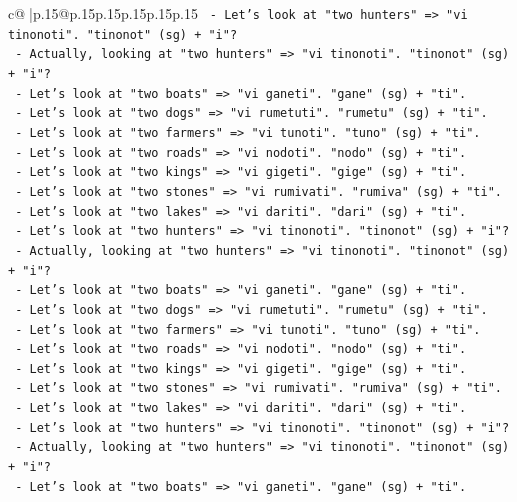 \documentclass{article}
\begin{document}
{\begin{supertabular}{c@{$\;$}|p{.15\linewidth}@{}p{.15\linewidth}p{.15\linewidth}p{.15\linewidth}p{.15\linewidth}p{.15\linewidth}}
{{{\texttt{    {-} Let's look at "two hunters" => "vi tinonoti". "tinonot" (sg) + "i"?} \\
\texttt{    {-} Actually, looking at "two hunters" => "vi tinonoti". "tinonot" (sg) + "i"?} \\
\texttt{    {-} Let's look at "two boats" => "vi ganeti". "gane" (sg) + "ti".} \\
\texttt{    {-} Let's look at "two dogs" => "vi rumetuti". "rumetu" (sg) + "ti".} \\
\texttt{    {-} Let's look at "two farmers" => "vi tunoti". "tuno" (sg) + "ti".} \\
\texttt{    {-} Let's look at "two roads" => "vi nodoti". "nodo" (sg) + "ti".} \\
\texttt{    {-} Let's look at "two kings" => "vi gigeti". "gige" (sg) + "ti".} \\
\texttt{    {-} Let's look at "two stones" => "vi rumivati". "rumiva" (sg) + "ti".} \\
\texttt{    {-} Let's look at "two lakes" => "vi dariti". "dari" (sg) + "ti".} \\
\texttt{    {-} Let's look at "two hunters" => "vi tinonoti". "tinonot" (sg) + "i"?} \\
\texttt{    {-} Actually, looking at "two hunters" => "vi tinonoti". "tinonot" (sg) + "i"?} \\
\texttt{    {-} Let's look at "two boats" => "vi ganeti". "gane" (sg) + "ti".} \\
\texttt{    {-} Let's look at "two dogs" => "vi rumetuti". "rumetu" (sg) + "ti".} \\
\texttt{    {-} Let's look at "two farmers" => "vi tunoti". "tuno" (sg) + "ti".} \\
\texttt{    {-} Let's look at "two roads" => "vi nodoti". "nodo" (sg) + "ti".} \\
\texttt{    {-} Let's look at "two kings" => "vi gigeti". "gige" (sg) + "ti".} \\
\texttt{    {-} Let's look at "two stones" => "vi rumivati". "rumiva" (sg) + "ti".} \\
\texttt{    {-} Let's look at "two lakes" => "vi dariti". "dari" (sg) + "ti".} \\
\texttt{    {-} Let's look at "two hunters" => "vi tinonoti". "tinonot" (sg) + "i"?} \\
\texttt{    {-} Actually, looking at "two hunters" => "vi tinonoti". "tinonot" (sg) + "i"?} \\
\texttt{    {-} Let's look at "two boats" => "vi ganeti". "gane" (sg) + "ti".} \\
}}}
\end{supertabular}}
\end{document}
